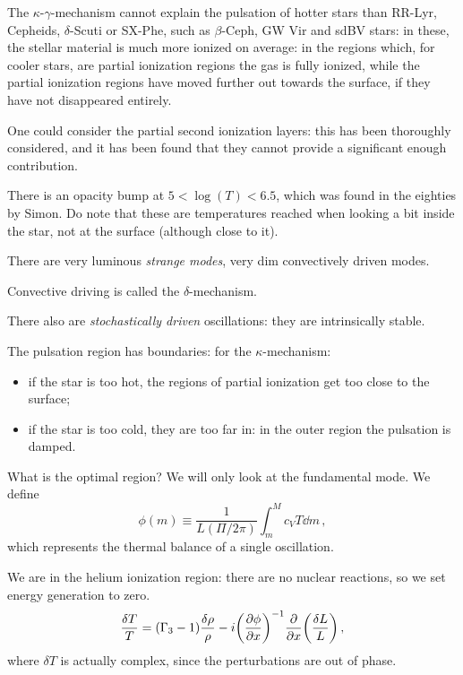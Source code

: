 \documentclass[main.tex]{subfiles}
\begin{document}
The \(\kappa \)-\(\gamma \)-mechanism cannot explain the pulsation of hotter stars than RR-Lyr, Cepheids, \(\delta \)-Scuti or SX-Phe, such as \(\beta\)-Ceph, GW Vir and sdBV stars: in these, the stellar material is much more ionized on average: in the regions which, for cooler stars, are partial ionization regions the gas is fully ionized, while the partial ionization regions have moved further out towards the surface, if they have not disappeared entirely.

One could consider the partial second ionization layers: this has been thoroughly considered, and it has been found that they cannot provide a significant enough contribution.

There is an opacity bump at \(5<\log(T)< 6.5 \), which was found in the eighties by Simon.
Do note that these are temperatures reached when looking a bit inside the star, not at the surface (although close to it).

There are very luminous \emph{strange modes}, very dim convectively driven modes.

Convective driving is called the \(\delta \)-mechanism.

There also are \emph{stochastically driven} oscillations: they are intrinsically stable.

The pulsation region has boundaries:
for the \(\kappa \)-mechanism:
\begin{itemize}
    \item if the star is too hot, the regions of partial ionization get too close to the surface;
    \item if the star is too cold, they are too far in: in the outer region the pulsation is damped.
\end{itemize}

What is the optimal region? We will only look  at the fundamental mode. We define
%
\begin{equation}
  \phi (m) \equiv \frac{1}{L(\Pi / 2 \pi )}\int_m^M c_V T \dd{m} 
\,,
\end{equation}
%
which represents the thermal balance of a single oscillation.

We are in the helium ionization region: there are no nuclear reactions, so we set energy generation to zero. 
%
\begin{equation}
  \frac{\delta T}{T} = (\Gamma_3 -1 ) \frac{\delta \rho }{\rho } - i \qty(\pdv{\phi }{x} )^{-1} \pdv{}{x} \qty(\frac{\delta L}{L})
\,,
\end{equation}
%
where \(\delta T\) is actually complex, since the perturbations are out of phase.
\end{document}
